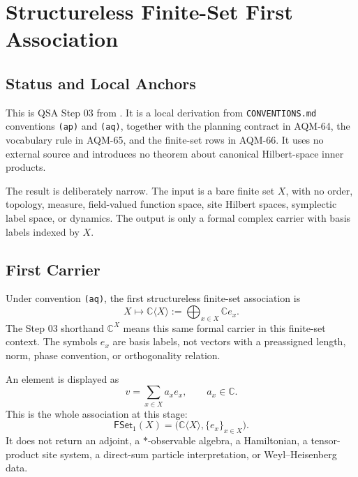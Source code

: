 
\section{Structureless Finite-Set First Association}
\label{sec:qsa-finite-set-first-association}

\subsection{Status and Local Anchors}

This is QSA Step 03 from
.  It is a local derivation
from \texttt{CONVENTIONS.md} conventions \texttt{(ap)} and \texttt{(aq)},
together with the planning contract in AQM-64, the vocabulary rule in AQM-65,
and the finite-set rows in AQM-66.  It uses no external source and introduces
no theorem about canonical Hilbert-space inner products.

The result is deliberately narrow.  The input is a bare finite set \(X\), with
no order, topology, measure, field-valued function space, site Hilbert spaces,
symplectic label space, or dynamics.  The output is only a formal complex
carrier with basis labels indexed by \(X\).

\subsection{First Carrier}

Under convention \texttt{(aq)}, the first structureless finite-set association
is
\[
  X \longmapsto \mathbb C\langle X\rangle
  :=
  \bigoplus_{x\in X} \mathbb C e_x .
\]
The Step 03 shorthand \(\mathbb C^X\) means this same formal carrier in this
finite-set context.  The symbols \(e_x\) are basis labels, not vectors with a
preassigned length, norm, phase convention, or orthogonality relation.

An element is displayed as
\[
  v=\sum_{x\in X} a_x e_x,\qquad a_x\in\mathbb C.
\]
This is the whole association at this stage:
\[
  \mathsf{FSet}_1(X)
  =
  \bigl(\mathbb C\langle X\rangle,\{e_x\}_{x\in X}\bigr).
\]
It does not return an adjoint, a \(*\)-observable algebra, a Hamiltonian, a
tensor-product site system, a direct-sum particle interpretation, or
Weyl--Heisenberg data.


